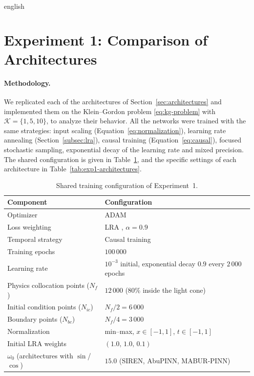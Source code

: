 \documentclass[../0000.tex]{subfiles}
\begin{document}
\begin{hyphenrules}{english}
\section{Experiment 1: Comparison of Architectures}\label{sec:exp-architectures}

\paragraph{Methodology.}
We replicated each of the architectures of Section~\ref{sec:architectures} and implemented them on the
Klein--Gordon problem \eqref{eq:kg-problem} with $\mathcal{K}=\{1,5,10\}$, to analyze their behavior. All
the networks were trained with the same strategies: input scaling (Equation~\eqref{eq:normalization}), learning rate
annealing (Section~\ref{subsec:lra}), causal training (Equation~\eqref{eq:causal}), focused stochastic sampling, exponential
decay of the learning rate and mixed precision. The shared configuration is given in
Table~\ref{tab:exp1-config}, and the specific settings of each architecture in Table~\ref{tab:exp1-architectures}.

\begin{table}[htbp]
  \centering
  \caption{Shared training configuration of Experiment~1.}
  \label{tab:exp1-config}
  \small
  \begin{tabular}{@{}ll@{}}
    \toprule
    Component & Configuration \\
    \midrule
    Optimizer & ADAM \cite{kingma2015} \\
    Loss weighting & LRA \cite{wang2021gradient}, $\alpha=0.9$ \\
    Temporal strategy & Causal training \cite{wang2024causality} \\
    Training epochs & $100\,000$ \\
    Learning rate & $10^{-3}$ initial, exponential decay $0.9$ every $2\,000$ epochs \\
    Physics collocation points ($N_f$) & $12\,000$ (80\% inside the light cone) \\
    Initial condition points ($N_{ic}$) & $N_f/2=6\,000$ \\
    Boundary points ($N_{bc}$) & $N_f/4=3\,000$ \\
    Normalization & min--max, $x\in[-1,1]$, $t\in[-1,1]$ \\
    Initial LRA weights & $(1.0,\,1.0,\,0.1)$ \\
    $\omega_0$ (architectures with $\sin$/$\cos$) & $15.0$ (SIREN, AbuPINN, MABUR-PINN) \\
    \bottomrule
  \end{tabular}
\end{table}


\end{hyphenrules}
\end{document}
